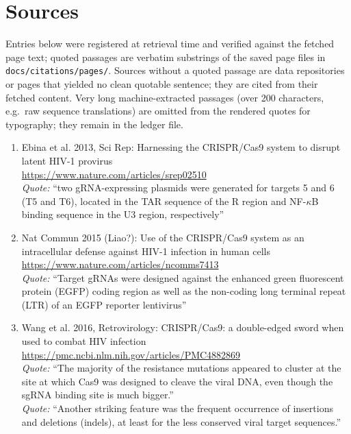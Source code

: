 \section*{Sources}
\small
Entries below were registered at retrieval time and verified against the fetched page text; quoted passages are verbatim substrings of the saved page files in \texttt{docs/citations/pages/}. Sources without a quoted passage are data repositories or pages that yielded no clean quotable sentence; they are cited from their fetched content. Very long machine-extracted passages (over 200 characters, e.g.\ raw sequence translations) are omitted from the rendered quotes for typography; they remain in the ledger file.

\begin{enumerate}
\item [1] Ebina et al. 2013, Sci Rep: Harnessing the CRISPR/Cas9 system to disrupt latent HIV-1 provirus \\ \url{https://www.nature.com/articles/srep02510}
  \\ {\sloppy \emph{Quote:} ``two gRNA-expressing plasmids were generated for targets 5 and 6 (T5 and T6), located in the TAR sequence of the R region and NF-$\kappa$B binding sequence in the U3 region, respectively''}

\item [2] Nat Commun 2015 (Liao?): Use of the CRISPR/Cas9 system as an intracellular defense against HIV-1 infection in human cells \\ \url{https://www.nature.com/articles/ncomms7413}
  \\ {\sloppy \emph{Quote:} ``Target gRNAs were designed against the enhanced green fluorescent protein (EGFP) coding region as well as the non-coding long terminal repeat (LTR) of an EGFP reporter lentivirus''}

\item [3] Wang et al. 2016, Retrovirology: CRISPR/Cas9: a double-edged sword when used to combat HIV infection \\ \url{https://pmc.ncbi.nlm.nih.gov/articles/PMC4882869}
  \\ {\sloppy \emph{Quote:} ``The majority of the resistance mutations appeared to cluster at the site at which Cas9 was designed to cleave the viral DNA, even though the sgRNA binding site is much bigger.''}
  \\ {\sloppy \emph{Quote:} ``Another striking feature was the frequent occurrence of insertions and deletions (indels), at least for the less conserved viral target sequences.''}


\end{enumerate}
